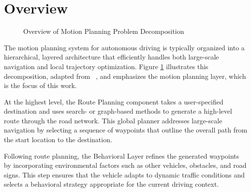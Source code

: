 \section{Overview} \label{sec:overview}

\begin{figure}[b]
	\centering
	\caption{Overview of Motion Planning Problem Decomposition}
	\label{fig:motion_planning_overview}
\end{figure}

The motion planning system for autonomous driving is typically organized into a hierarchical, layered architecture that efficiently handles both
large-scale navigation and local trajectory optimization.
Figure \ref{fig:motion_planning_overview} illustrates this decomposition, adapted from ~\cite{paden_survey_2016}, and emphasizes the motion planning
layer, which is the focus of this work.

At the highest level, the Route Planning component takes a user-specified destination and uses search- or graph-based methods to generate a
high-level route through the road network.
This global planner addresses large-scale navigation by selecting a sequence of waypoints that outline the overall path from the start location to
the destination.

Following route planning, the Behavioral Layer refines the generated waypoints by incorporating environmental factors such as other vehicles,
obstacles, and road signs.
This step ensures that the vehicle adapts to dynamic traffic conditions and selects a behavioral strategy appropriate for the current driving
context.

